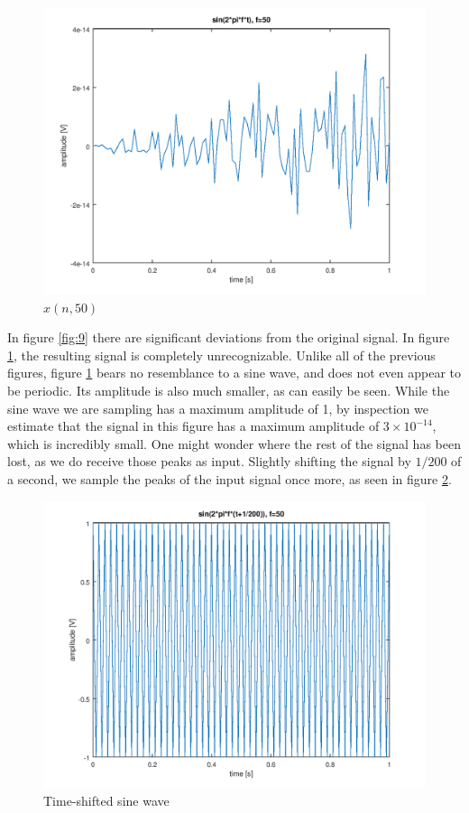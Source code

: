 \documentclass[a4paper, 12pt]{report}
\begin{document}
			\begin{figure}[H]
				\includegraphics[width=\textwidth]{img/1_10.png}
				\caption{$x(n, 50)$}
				\label{fig:10}
			\end{figure}

			In figure \ref{fig:9} there are significant deviations from the original signal. In figure \ref{fig:10}, the resulting signal is completely unrecognizable. Unlike all of the previous figures, figure \ref{fig:10} bears no resemblance to a sine wave, and does not even appear to be periodic. Its amplitude is also much smaller, as can easily be seen. While the sine wave we are sampling has a maximum amplitude of 1, by inspection we estimate that the signal in this figure has a maximum amplitude of $3\times10^{-14}$, which is incredibly small. One might wonder where the rest of the signal has been lost, as we do receive those peaks as input. Slightly shifting the signal by $1/200$ of a second, we sample the peaks of the input signal once more, as seen in figure \ref{fig:11}.

			\begin{figure}[H]
				\includegraphics[width=\textwidth]{img/1_11_shift.png}
				\caption{Time-shifted sine wave}
				\label{fig:11}
			\end{figure}
\end{document}
